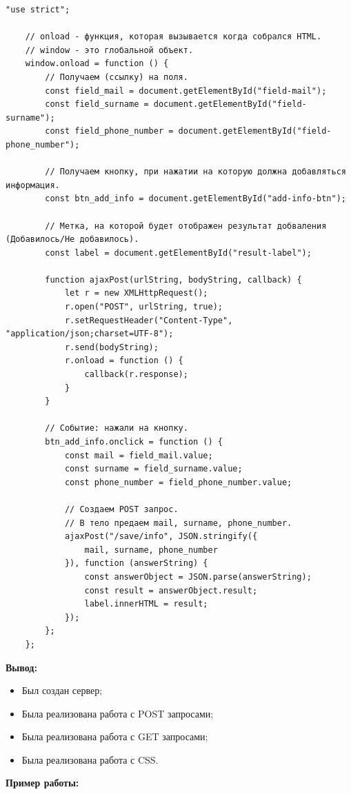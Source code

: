\begin{lstlisting}[caption=Код программы. TASK\_1. Дополнительный скрипт]
	"use strict";

	// onload - функция, которая вызывается когда собрался HTML.
	// window - это глобальной объект.
	window.onload = function () {
		// Получаем (ссылку) на поля.
		const field_mail = document.getElementById("field-mail");
		const field_surname = document.getElementById("field-surname");
		const field_phone_number = document.getElementById("field-phone_number");
	
		// Получаем кнопку, при нажатии на которую должна добавляться информация.
		const btn_add_info = document.getElementById("add-info-btn");
	
		// Метка, на которой будет отображен результат добваления (Добавилось/Не добавилось).
		const label = document.getElementById("result-label");
	
		function ajaxPost(urlString, bodyString, callback) {
			let r = new XMLHttpRequest();
			r.open("POST", urlString, true);
			r.setRequestHeader("Content-Type", "application/json;charset=UTF-8");
			r.send(bodyString);
			r.onload = function () {
				callback(r.response);
			}
		}
	
		// Событие: нажали на кнопку.
		btn_add_info.onclick = function () {
			const mail = field_mail.value;
			const surname = field_surname.value;
			const phone_number = field_phone_number.value;
	
			// Создаем POST запрос. 
			// В тело предаем mail, surname, phone_number.
			ajaxPost("/save/info", JSON.stringify({
				mail, surname, phone_number
			}), function (answerString) {
				const answerObject = JSON.parse(answerString);
				const result = answerObject.result;
				label.innerHTML = result;
			});
		};
	};
\end{lstlisting}

\textbf{Вывод:}

\begin{itemize} 
	\item Был создан сервер;
	\item Была реализована работа с POST запросами;
	\item Была реализована работа с GET запросами;
	\item Была реализована работа с CSS.
\end{itemize}

\textbf{Пример работы:}

